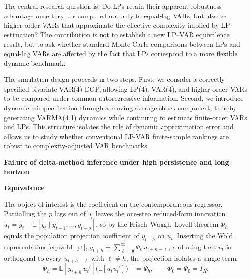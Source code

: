 
The central research question is: Do LPs retain their apparent robustness advantage once they are compared not only to equal-lag VARs, but also to higher-order VARs that approximate the effective complexity implied by LP estimation? The contribution is not to establish a new LP–VAR equivalence result, but to ask whether standard Monte Carlo comparisons between LPs and equal-lag VARs are affected by the fact that LPs correspond to a more flexible dynamic benchmark.

The simulation design proceeds in two steps. First, we consider a correctly specified 
bivariate VAR(4) DGP, allowing LP(4), VAR(4), and higher-order VARs to be compared 
under common autoregressive information. Second, we introduce dynamic misspecification 
through a moving-average shock component, thereby generating VARMA(4,1) dynamics 
while continuing to estimate finite-order VARs and LPs. This structure isolates the 
role of dynamic approximation error and allows us to study whether conventional LP-VAR 
finite-sample rankings are robust to complexity-adjusted VAR benchmarks.


\textbf{Failure of delta-method inference under high persistence and long horizon}
\textcite{kilian1998small}
\textcite{kilian1999finite}
\textcite{kilian2000accurate}


\textbf{Equivalance}

The object of interest is the coefficient on the contemporaneous regressor.
Partialling the $p$ lags out of $y_t$ leaves the one-step reduced-form
innovation $u_t = y_t - \mathbb{E}\!\left[y_t \mid y_{t-1}, \ldots,
y_{t-p}\right]$, so by the Frisch--Waugh--Lovell theorem $\Phi_h$ equals the population projection coefficient of $y_{t+h}$ on $u_t$. Inserting the Wold representation \eqref{eq:wold_yt}, $y_{t+h} = \sum_{\ell=0}^{\infty}
\Psi_\ell\, u_{t+h-\ell}$, and using that $u_t$ is orthogonal to every
$u_{t+h-\ell}$ with $\ell \neq h$, the projection isolates a single term,
%
\begin{equation}
    \Phi_h = \mathbb{E}\!\left[y_{t+h}\, u_t'\right]
             \bigl(\mathbb{E}\!\left[u_t u_t'\right]\bigr)^{-1}
           = \Psi_h,
    \qquad \Phi_0 = \Psi_0 = I_K.
    \label{eq:lp_psi}
\end{equation}



